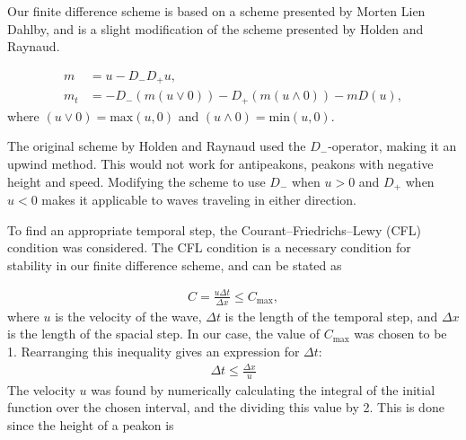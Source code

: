 Our finite difference scheme is based on a scheme presented by Morten Lien Dahlby\cite{dahlby2007geometric}, and is a slight modification of the scheme presented by Holden and Raynaud\cite{holden2006convergence}. 

\begin{align}
m &= u - D_{-}D_{+}u, \\
m_t &= -D_{-}(m(u \vee 0)) -D_{+}(m(u \wedge 0)) - mD(u),
\end{align}
where $(u \vee 0) = \text{max}(u,0)$ and $(u \wedge 0) = \text{min}(u,0)$.

The original scheme by Holden and Raynaud used the $D_{-}$-operator, making it an upwind method. This would not work for antipeakons, peakons with negative height and speed. Modifying the scheme to use  $D_{-}$ when $u > 0$ and $D_{+}$ when $ u < 0$ makes it applicable to waves traveling in either direction. 

To find an appropriate temporal step, the Courant–Friedrichs–Lewy (CFL) condition was considered. The CFL condition is a necessary condition for stability in our finite difference scheme, and can be stated as

\begin{align}
C = \frac{u\Delta t}{\Delta x} \leq C_{\text{max}},
\end{align}
where $u$ is the velocity of the wave, $\Delta t$ is the length of the temporal step, and $\Delta x$ is the length of the spacial step. In our case, the value of $C_{\text{max}}$ was chosen to be 1. Rearranging this inequality gives an expression for $\Delta t$:
\begin{align}
\Delta t \leq \frac{\Delta x}{u}
\end{align}
The velocity $u$ was found by numerically calculating the integral of the initial function over the chosen interval, and the dividing this value by 2. This is done since the height of a peakon is 


